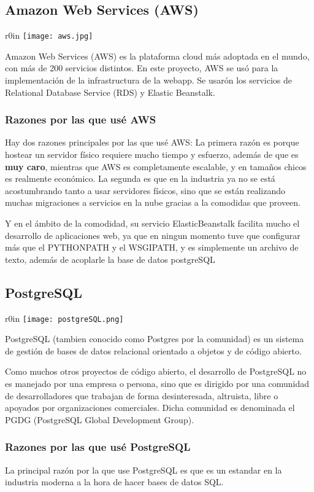 \documentclass[../informe_krapp.tex]{subfiles}
\begin{document}
\subsection{Amazon Web Services (AWS)}
\begin{wrapfigure}{r}{0in}
	\texttt{[image: aws.jpg]}
\end{wrapfigure}
Amazon Web Services (AWS) es la plataforma cloud más adoptada en el mundo, con más de 200 servicios distintos.
En este proyecto, AWS se usó para la implementación de la infrastructura de la webapp.
Se usarón los servicios de Relational Database Service (RDS) y Elastic Beanstalk.

\subsubsection{Razones por las que usé AWS}
Hay dos razones principales por las que usé AWS: La primera razón es porque hostear un servidor físico requiere mucho tiempo y esfuerzo, además de que es \textbf{muy caro}, mientras que AWS es completamente escalable, y en tamaños chicos es realmente económico. La segunda es que en la industria ya no se está acostumbrando tanto a usar servidores físicos, sino que se están realizando muchas migraciones a servicios en la nube gracias a la comodidas que proveen.

Y en el ámbito de la comodidad, su servicio ElasticBeanstalk facilita mucho el desarrollo de aplicaciones web, ya que en ningun momento tuve que configurar más que el PYTHONPATH y el WSGIPATH, y es simplemente un archivo de texto, además de acoplarle la base de datos postgreSQL

\subsection{PostgreSQL}
\begin{wrapfigure}{r}{0in}
	\texttt{[image: postgreSQL.png]}
\end{wrapfigure}
PostgreSQL (tambien conocido como Postgres por la comunidad) es un sistema de gestión de bases de datos relacional orientado a objetos y de código abierto.

Como muchos otros proyectos de código abierto, el desarrollo de PostgreSQL no es manejado por una empresa o persona, sino que es dirigido por una comunidad de desarrolladores que trabajan de forma desinteresada, altruista, libre o apoyados por organizaciones comerciales. Dicha comunidad es denominada el PGDG (PostgreSQL Global Development Group).

\subsubsection{Razones por las que usé PostgreSQL}
La principal razón por la que use PostgreSQL es que es un estandar en la industria moderna a la hora de hacer bases de datos SQL.
\end{document}
